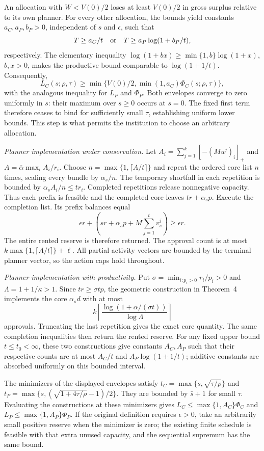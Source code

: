 \documentclass[ecta,draft,supplement]{econsocart}
\theoremstyle{definition}
\theoremstyle{definition}
\begin{document}
\begin{appendix}
An allocation with $W<V(0)/2$ loses at least $V(0)/2$ in gross
surplus relative to its own planner. For every other allocation,
the bounds yield constants $a_C,a_P,b_P>0$, independent of $s$
and $\epsilon$, such that
\[
 T\geq a_C/t\quad\hbox{or}\quad
 T\geq a_P\log(1+b_P/t),
\]
respectively. The elementary inequality
$\log(1+bx)\geq\min\{1,b\}\log(1+x)$, $b,x>0$, makes the
productive bound comparable to $\log(1+1/t)$. Consequently,
\[
 L_C(s;\rho,\tau)\geq
 \min\{V(0)/2,\min(1,a_C)\Phi_C(s;\rho,\tau)\},
\]
with the analogous inequality for $L_P$ and $\Phi_P$.
Both envelopes converge to zero uniformly in $s$: their maximum
over $s\geq0$ occurs at $s=0$. The fixed first term therefore
ceases to bind for sufficiently small $\tau$, establishing
uniform lower bounds. This step is what permits the institution
to choose an arbitrary allocation.

\emph{Planner implementation under conservation.}
Let
$A_i=\sum_{j=1}^k[-(Mu^j)_i]_+$ and
$A=\overline\alpha\max_i A_i/r_i$.
Choose $n=\max\{1,\lceil A/t\rceil\}$ and repeat the ordered
core list $n$ times, scaling every bundle by $\alpha_s/n$.
The temporary shortfall in each repetition is bounded by
$\alpha_s A_i/n\leq tr_i$. Completed repetitions release
nonnegative capacity. Thus each prefix is feasible and the
completed core leaves $tr+\alpha_sp$.
Execute the completion list. Its prefix balances equal
\[
 \epsilon r+
 \left(sr+\alpha_sp+M\sum_{j=1}^t v_s^j\right)\geq\epsilon r.
\]
The entire rented reserve is therefore returned. The approval
count is at most $k\max\{1,\lceil A/t\rceil\}+\ell$.
All partial activity vectors are bounded by the terminal planner
vector, so the action caps hold throughout.

\emph{Planner implementation with productivity.}
Put $\sigma=\min_{i:p_i>0}r_i/p_i>0$ and
$\Lambda=1+1/\kappa>1$. Since $tr\geq\sigma t p$,
the geometric construction in
Theorem~4%
 implements the core
$\alpha_s d$ with at most
\[
 k\left\lceil
 \frac{\log(1+\overline\alpha/(\sigma t))}{\log\Lambda}
 \right\rceil
\]
approvals. Truncating the last repetition gives the exact core
quantity. The same completion inequalities then return the rented
reserve. For any fixed upper bound $t\leq t_0<\infty$, these
two constructions give constants $A_C,A_P$ such that their
respective counts are at most $A_C/t$ and
$A_P\log(1+1/t)$; additive constants are absorbed uniformly
on this bounded interval.

The minimizers of the displayed envelopes satisfy
$t_C=\max\{s,\sqrt{\tau/\rho}\}$ and
$t_P=\max\{s,(\sqrt{1+4\tau/\rho}-1)/2\}$.
They are bounded by $\bar s+1$ for small $\tau$.
Evaluating the constructions at these minimizers gives
$L_C\leq\max\{1,A_C\}\Phi_C$ and
$L_P\leq\max\{1,A_P\}\Phi_P$.
If the original definition requires $\epsilon>0$, take an
arbitrarily small positive reserve when the minimizer is zero;
the existing finite schedule is feasible with that extra unused
capacity, and the sequential supremum has the same bound.


\end{appendix}
\end{document}
